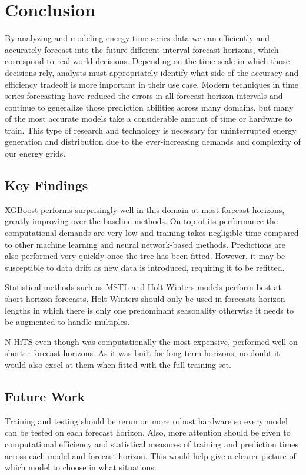 \documentclass[sigconf]{acmart}
\begin{document}
\section{Conclusion}
By analyzing and modeling energy time series data we can efficiently and accurately forecast into the future different interval forecast horizons, which correspond to real-world decisions. Depending on the time-scale in which those decisions rely, analysts must appropriately identify what side of the accuracy and efficiency tradeoff is more important in their use case. Modern techniques in time series forecasting have reduced the errors in all forecast horizon intervals and continue to generalize those prediction abilities across many domains, but many of the most accurate models take a considerable amount of time or hardware to train. This type of research and technology is necessary for uninterrupted energy generation and distribution due to the ever-increasing demands and complexity of our energy grids.

\subsection{Key Findings}
XGBoost performs surprisingly well in this domain at most forecast horizons, greatly improving over the baseline methods. On top of its performance the computational demands are very low and training takes negligible time compared to other machine learning and neural network-based methods. Predictions are also performed very quickly once the tree has been fitted. However, it may be susceptible to data drift as new data is introduced, requiring it to be refitted.

Statistical methods such as MSTL and Holt-Winters models perform best at short horizon forecasts. Holt-Winters should only be used in forecasts horizon lengths in which there is only one predominant seasonality otherwise it needs to be augmented to handle multiples.

N-HiTS even though was computationally the most expensive, performed well on shorter forecast horizons. As it was built for long-term horizons, no doubt it would also excel at them when fitted with the full training set.

\subsection{Future Work}
Training and testing should be rerun on more robust hardware so every model can be tested on each forecast horizon. Also, more attention should be given to computational efficiency and statistical measures of training and prediction times across each model and forecast horizon. This would help give a clearer picture of which model to choose in what situations.
\end{document}
